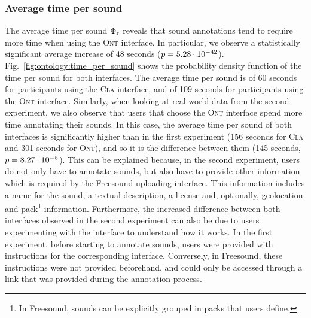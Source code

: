\subsubsection{Average time per sound}



The average time per sound $\Phi_{\text{r}}$ reveals that sound annotations tend to require more time when using the \textsc{Ont} interface.
In particular, we observe a statistically significant average increase of 48 seconds ($p = 5.28\cdot 10^{-42}$). Fig.~\ref{fig:ontology:time_per_sound} shows the probability density function of the time per sound for both interfaces. The average time per sound is of 60 seconds for participants using the \textsc{Cla} interface, and of 109 seconds for participants using the \textsc{Ont} interface.
Similarly, when looking at real-world data from the second experiment, we also observe that users that choose the \textsc{Ont} interface spend more time annotating their sounds. In this case, the average time per sound of both interfaces is significantly higher than in the first experiment (156 seconds for \textsc{Cla} and 301 seconds for \textsc{Ont}), and so it is the difference between them (145 seconds, $p = 8.27\cdot 10^{-5}$).
This can be explained because, in the second experiment, users do not only have to annotate sounds, but also have to provide other information which is required by the Freesound uploading interface. This information includes a name for the sound, a textual description, a license and, optionally, geolocation and pack\footnote{In Freesound, sounds can be explicitly grouped in packs that users define.} information.
Furthermore, the increased difference between both interfaces observed in the second experiment can also be due to users experimenting with the interface to understand how it works. In the first experiment, before starting to annotate sounds, users were provided with instructions for the corresponding interface. Conversely, in Freesound, these instructions were not provided beforehand, and could only be accessed through a link that was provided during the annotation process.


